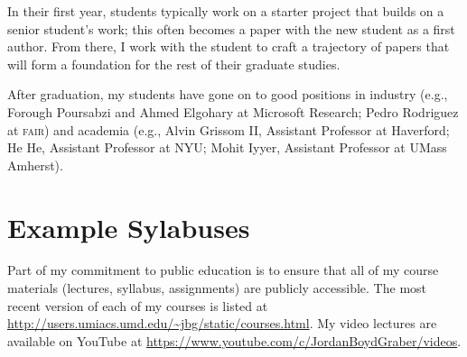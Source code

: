 \documentclass[11pt]{amsart}
\newcommand{\abr}[1]{\textsc{#1}}
\newcommand{\student}[1]{\vspace{.5cm}\fbox{\parbox{0.95\linewidth}{{\small #1}}}\vspace{.5cm}}
\begin{document}
In their first year, students typically work on a starter project that
builds on a senior student's work; this often becomes a paper with the
new student as a first author.  From there, I work with the student to
craft a trajectory of papers that will form a foundation for the rest
of their graduate studies.

After graduation, my students have gone on to good positions in
industry (e.g., Forough Poursabzi and Ahmed Elgohary at Microsoft
Research; Pedro Rodriguez at \abr{fair}) and academia (e.g., Alvin
Grissom II, Assistant Professor at Haverford; He He, Assistant
Professor at NYU; Mohit Iyyer, Assistant Professor at UMass Amherst).

\section{Example Sylabuses}

Part of my commitment to public education is to ensure that all of my
course materials (lectures, syllabus, assignments) are publicly
accessible. The most recent version of each of my courses is listed at
\url{http://users.umiacs.umd.edu/~jbg/static/courses.html}.  My
video lectures are available on
YouTube at \url{https://www.youtube.com/c/JordanBoydGraber/videos}.



\end{document}
